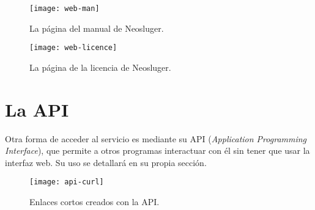 \begin{figure}[ht!]
	\texttt{[image: web-man]}
	\caption{La página del manual de Neosluger.}
\end{figure}

\begin{figure}[ht!]
	\texttt{[image: web-licence]}
	\caption{La página de la licencia de Neosluger.}
\end{figure}


\section{La API}\label{la-api}

Otra forma de acceder al servicio es mediante su API (\textit{Application Programming Interface}), que permite a otros programas interactuar con él sin tener que usar la interfaz web.
Su uso se detallará en su propia sección.

\begin{figure}[ht!]
	\texttt{[image: api-curl]}
	\caption{Enlaces cortos creados con la API.}
\end{figure}
